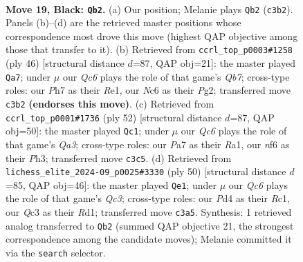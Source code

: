 \documentclass[11pt]{article}
\begin{document}
\clearpage

\begin{figure}[p]\centering
\begin{subfigure}{0.46\textwidth}\centering
\resizebox{\linewidth}{!}{%
\newchessgame
\chessboard[
  setfen={r6r/ppk2p1p/2n2N2/4N1Q1/3p4/2qP4/b4PPP/2R3K1 b - - 1 19},
  showmover=false,
  pgfstyle=straightmove, color=movearrow, markmove={c3-b2}
]}
\caption{}
\end{subfigure}\hfill
\begin{subfigure}{0.46\textwidth}\centering
\resizebox{\linewidth}{!}{%
\newchessgame
\chessboard[
  setfen={1r4k1/1Q3ppp/3qpn2/p7/P3P3/2N5/1P3PPP/4R1K1 w - - 1 24},
  showmover=false,
  pgfstyle=straightmove, color=movearrow, markmove={b7-a7}
]}
\caption{}
\end{subfigure}
\\[4pt]
\begin{subfigure}{0.46\textwidth}\centering
\resizebox{\linewidth}{!}{%
\newchessgame
\chessboard[
  setfen={2r3k1/p4pp1/1p5p/Pnn5/2qN4/Q3P2P/5PP1/R3B1K1 w - - 1 27},
  showmover=false,
  pgfstyle=straightmove, color=movearrow, markmove={a3-c1}
]}
\caption{}
\end{subfigure}\hfill
\begin{subfigure}{0.46\textwidth}\centering
\resizebox{\linewidth}{!}{%
\newchessgame
\chessboard[
  setfen={2r3k1/pq3ppp/8/2rP4/5N2/2Q3P1/Pn3P1P/2RR2K1 w - - 1 26},
  showmover=false,
  pgfstyle=straightmove, color=movearrow, markmove={c3-e1}
]}
\caption{}
\end{subfigure}
\caption{\textbf{Move 19, Black: \texttt{Qb2}.} (a) Our position; Melanie plays \texttt{Qb2} (\texttt{c3b2}). Panels (b)--(d) are the retrieved master positions whose correspondence most drove this move (highest QAP objective among those that transfer to it). (b) Retrieved from \texttt{ccrl\_top\_p0003\#1258} (ply 46) [structural distance $d$=87, QAP obj=21]: the master played \texttt{Qa7}; under $\mu$ our \emph{Qc6} plays the role of that game's \emph{Qb7}; cross-type roles: our \emph{P}h7 as their \emph{R}e1, our \emph{N}c6 as their \emph{P}g2; transferred move \texttt{c3b2} \textbf{(endorses this move)}. (c) Retrieved from \texttt{ccrl\_top\_p0001\#1736} (ply 52) [structural distance $d$=87, QAP obj=50]: the master played \texttt{Qc1}; under $\mu$ our \emph{Qc6} plays the role of that game's \emph{Qa3}; cross-type roles: our \emph{P}a7 as their \emph{R}a1, our \emph{n}f6 as their \emph{P}h3; transferred move \texttt{c3c5}. (d) Retrieved from \texttt{lichess\_elite\_2024-09\_p0025\#3330} (ply 50) [structural distance $d$=85, QAP obj=46]: the master played \texttt{Qe1}; under $\mu$ our \emph{Qc6} plays the role of that game's \emph{Qc3}; cross-type roles: our \emph{P}d4 as their \emph{R}c1, our \emph{Q}c3 as their \emph{R}d1; transferred move \texttt{c3a5}. Synthesis: 1 retrieved analog transferred to \texttt{Qb2} (summed QAP objective 21, the strongest correspondence among the candidate moves); Melanie committed it via the \texttt{search} selector.}
\label{fig:thought-m37}
\end{figure}
\end{document}
